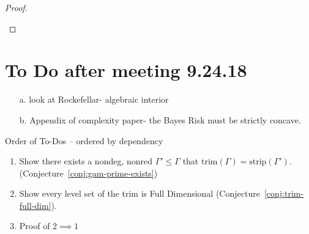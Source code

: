 \documentclass[12pt]{article}
\newcommand{\Comments}{1}
\newcommand{\mynote}[2]{\ifnum\Comments=1\textcolor{#1}{#2}\fi}
\newcommand{\jessie}[1]{\mynote{purple}{[JF: #1]}}
\newcommand{\R}{\mathcal{R}}
\newcommand{\inter}[1]{\mathring{#1}}%
\newcommand{\trim}{\mathrm{trim}}
\newcommand{\strip}{\text{strip}}
\begin{document}
\begin{proof}
\begin{enumerate}
%
%
%


\end{enumerate} 

\end{proof}

\section{To Do after meeting 9.24.18}


\begin{enumerate}
\item[a.] look at Rockefellar- algebraic interior

\item[b.] Appendix of complexity paper- the Bayes Risk must be strictly concave.
\end{enumerate}

Order of To-Dos -- ordered by dependency
\begin{enumerate}
\item Show there exists a nondeg, nonred $\Gamma' \leq \Gamma$ that $\trim(\Gamma) = \strip(\Gamma')$. (Conjecture~\ref{conj:gam-prime-exists}) 
\item Show every level set of the trim is Full Dimensional (Conjecture~\ref{conj:trim-full-dim}).
\item Proof of $2 \implies 1$
\end{enumerate}
\end{document}
